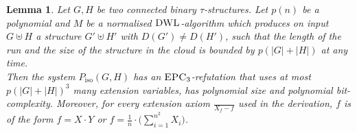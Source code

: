 \documentclass[10pt,a4paper]{article}
\newtheorem{lemma}[theorem]{Lemma}
\newcommand{\EPC}{\mbox{\sc EPC}}
\newcommand{\DWL}{\mbox{\sc DWL}}
\newcommand{\Piso}{P_{\text{iso}}}
\begin{document}
	\begin{lemma}
		\label{lem:PC_transferToProofComplexity}
		Let $G, H$ be two connected binary $\tau$-structures. Let $p(n)$ be a polynomial and $M$ be a normalised $\DWL$-algorithm which produces on input $G \uplus H$ a structure $G' \uplus H'$ with $D(G') \neq D(H')$, such that the length of the run and the size of the structure in the cloud is bounded by $p(|G| + |H|)$ at any time.\\
		Then the system $\Piso(G,H)$ has an $\EPC_3$-refutation that uses at most $p(|G| + |H|)^3$ many extension variables, has polynomial size and polynomial bit-complexity. Moreover, for every extension axiom $\frac{}{X_f -f}$ used in the derivation, $f$ is of the form $f = X \cdot Y$ or $f = \frac{1}{n} \cdot \Big(\sum_{i=1}^{n^2} X_i\Big)$.
	\end{lemma}	
\end{document}
